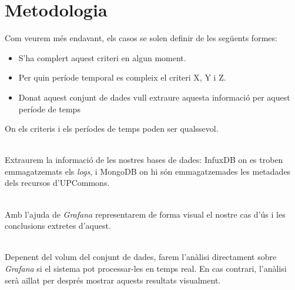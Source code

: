 \section{Metodologia}\label{sec:analysis-visualization-methodology}

\noindent
Com veurem més endavant, els casos se solen definir de les següents formes:

\begin{itemize}
    \item S'ha complert aquest criteri en algun moment.
    \item Per quin període temporal es compleix el criteri X, Y i Z.
    \item Donat aquest conjunt de dades vull extraure aquesta informació per aquest període de temps
\end{itemize}

\noindent
On els criteris i els períodes de temps poden ser qualssevol.

\noindent \\
Extraurem la informació de les nostres bases de dades: InfuxDB on es troben emmagatzemats els \textit{\gls{log}s}, i MongoDB on hi són emmagatzemades les metadades dels recursos d'\gls{UPCommons}.

\noindent \\
Amb l'ajuda de \textit{Grafana} representarem de forma visual el nostre cas d'ús i les conclusions extretes d'aquest.

\noindent \\
Depenent del volum del conjunt de dades,  farem l'anàlisi directament sobre \textit{Grafana} si el sistema pot processar-les en temps real.
En cas contrari, l'anàlisi serà aïllat per després mostrar aquests resultats visualment.
